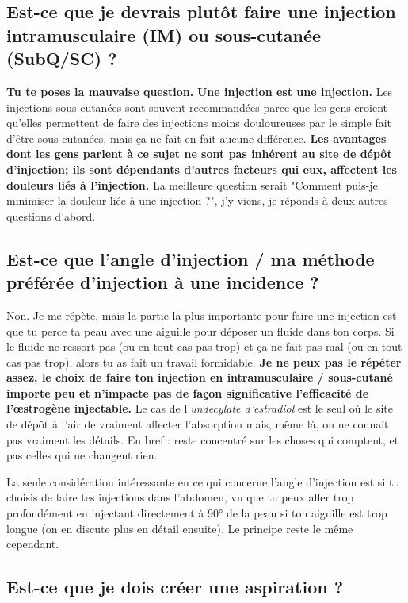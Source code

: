 \documentclass{article}
\begin{document}
\subsection{Est-ce que je devrais plutôt faire une injection intramusculaire (IM) ou  sous-cutanée (SubQ/SC) ?}

\textbf{Tu te poses la mauvaise question.} \textbf{Une injection est une injection.} Les injections sous-cutanées sont souvent recommandées parce que les gens croient qu'elles permettent de faire des injections moins douloureuses par le simple fait d'être sous-cutanées, mais ça ne fait en fait aucune différence. \textbf{Les avantages dont les gens parlent à ce sujet ne sont pas inhérent au site de dépôt d'injection; ils sont dépendants d'autres facteurs qui eux, affectent les douleurs liés à l'injection.} La meilleure question serait "Comment puis-je minimiser la douleur liée à une injection ?", j'y viens, je réponds à deux autres questions d'abord. 

\subsection{Est-ce que l'angle d'injection / ma méthode préférée d'injection à une incidence ?}\label{5-9}

Non. Je me répète, mais la partie la plus importante pour faire une injection est que tu perce ta peau avec une aiguille pour déposer un fluide dans ton corps. Si le fluide ne ressort pas (ou en tout cas pas trop) et ça ne fait pas mal (ou en tout cas pas trop), alors tu as fait un travail formidable. \textbf{Je ne peux pas le répéter assez, le choix de faire ton injection en intramusculaire / sous-cutané importe peu et n'impacte pas de façon significative l'efficacité de l'œstrogène injectable. } Le cas de l'\textit{undecylate d'estradiol} est le seul où le site de dépôt à l'air de vraiment affecter l'absorption mais, même là, on ne connait pas vraiment les détails. En bref : reste concentré sur les choses qui comptent, et pas celles qui ne changent rien.

La seule considération intéressante en ce qui concerne l'angle d'injection est si tu choisis de faire tes injections dans l'abdomen, vu que tu peux aller trop profondément en injectant directement à 90° de la peau si ton aiguille est trop longue (on en discute plus en détail ensuite). Le principe reste le même cependant.

\subsection{Est-ce que je dois créer une aspiration ?}
\end{document}
